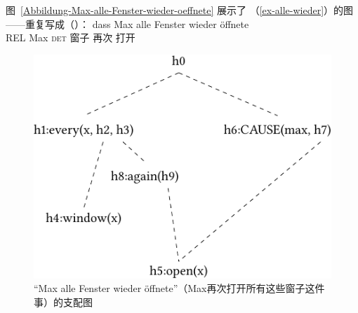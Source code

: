 图~\vref{Abbildung-Max-alle-Fenster-wieder-oeffnete} 展示了 （\ref{ex-alle-wieder}）的图——重复写成（）：
\ea
\label{ex-alle-wieder-zwei}
\gll dass Max alle Fenster wieder öffnete\\
	 REL Max \textsc{det} 窗子 再次 打开\\
\z
\begin{figure}
\centering
\includegraphics{Figures/mrs-max-alle-fenster-wieder-oeffnete-cropped.pdf}
\caption{“Max alle Fenster wieder öffnete”（Max再次打开所有这些窗子这件事）的支配图\label{Abbildung-Max-alle-Fenster-wieder-oeffnete}}
\end{figure}%
